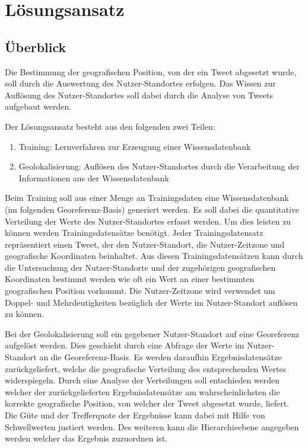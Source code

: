 \chapter{Lösungsansatz} \label{chp:Loesungsansatz}
	
	\section{Überblick} 

		Die Bestimmung der geografischen Position, von der ein Tweet abgesetzt wurde, soll durch die Auswertung des Nutzer-Standortes erfolgen. 
		Das Wissen zur Auflösung des Nutzer-Standortes soll dabei durch die Analyse von Tweets aufgebaut werden.
		
		Der Lösungsansatz besteht aus den folgenden zwei Teilen:

		\begin{enumerate}
			\item Training: Lernverfahren zur Erzeugung einer Wissensdatenbank 
			\item Geolokalisierung: Auflösen des Nutzer-Standortes durch die Verarbeitung der Informationen aus der Wissensdatenbank
		\end{enumerate}

		Beim Training soll aus einer Menge an Trainingsdaten eine Wissensdatenbank (im folgenden Georeferenz-Basis) generiert werden.
		Es soll dabei die quantitative Verteilung der Werte des Nutzer-Standortes erfasst werden.
		Um dies leisten zu können werden Trainingsdatensätze benötigt. 
		Jeder Trainingsdatensatz repräsentiert einen Tweet, der den Nutzer-Standort, die Nutzer-Zeitzone und geografische Koordinaten beinhaltet.
		Aus diesen Trainingsdatensätzen kann durch die Untersuchung der Nutzer-Standorte und der zugehörigen geografischen Koordinaten bestimmt werden wie oft ein Wert an einer bestimmten geografischen Position vorkommt.
		Die Nutzer-Zeitzone wird verwendet um Doppel- und Mehrdeutigkeiten bezüglich der Werte im Nutzer-Standort auflösen zu können.  

		Bei der Geolokalisierung soll ein gegebener Nutzer-Standort auf eine Georeferenz aufgelöst werden. 
		Dies geschieht durch eine Abfrage der Werte im Nutzer-Standort an die Georeferenz-Basis.
		Es werden daraufhin Ergebnisdatensätze zurückgeliefert, welche die geografische Verteilung des entsprechenden Wertes widerspiegeln.
		Durch eine Analyse der Verteilungen soll entschieden werden welcher der zurückgelieferten Ergebnisdatensätze am wahrscheinlichsten die korrekte geografische Position, von welcher der Tweet abgesetzt wurde, liefert.
		Die Güte und der Trefferquote der Ergebnisse kann dabei mit Hilfe von Schwellwerten justiert werden.
		Des weiteren kann die Hierarchieebene angegeben werden welcher das Ergebnis zuzuordnen ist.

